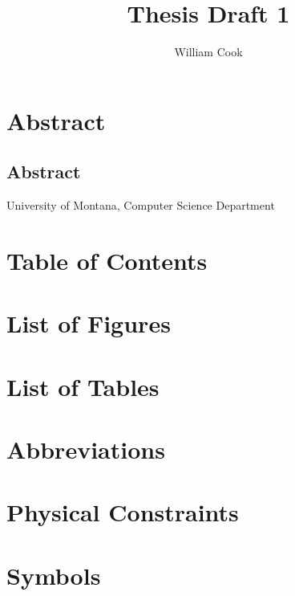 \documentclass[10pt,a4paper]{article}
\author{William Cook}
\title{Thesis Draft 1}
\begin{document}
\chapter{Abstract}
\section{Abstract}
\begin{center}
\begin{large}
University of Montana, Computer Science Department
\end{large}
\end{center}

\chapter{Table of Contents}
\chapter{List of Figures}
\chapter{List of Tables}
\chapter{Abbreviations}
\chapter{Physical Constraints}
\chapter{Symbols}
\end{document}
